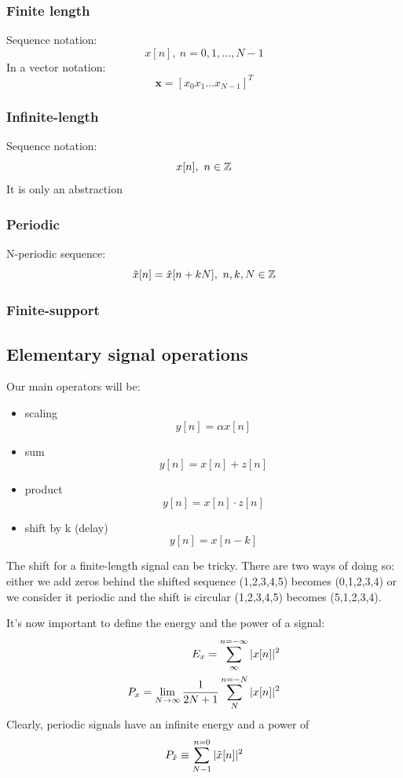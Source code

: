 \documentclass[11pt,a4paper]{article}
\numberwithin{equation}{section}
\begin{document}
\subsubsection{Finite length}
Sequence notation:
\begin{equation}
    x[n],\ n=0,1,\ldots,N-1
\end{equation}
In a vector notation: 
\begin{equation}
    \mathbf{x} = [x_0x_1\ldots x_{N-1}]^T
\end{equation}
\subsubsection{Infinite-length}
Sequence notation: 
\begin{equation}
    x[n],\ n\in \Z
\end{equation}
It is only an abstraction

\subsubsection{Periodic}
N-periodic sequence: 
\begin{equation}
    \tilde{x}[n] = \tilde{x}[n+kN],\ n,k,N \in \Z
\end{equation}
\subsubsection{Finite-support}
\subsection{Elementary signal operations}
Our main operators will be:
\begin{itemize}
    \item scaling
        \[y[n] = \alpha x[n]\]
    \item sum
        \[y[n] = x[n] + z[n]\]
    \item product
        \[y[n] = x[n] \cdot z[n]\]
    \item shift by k (delay)
        \[y[n] = x[n-k]\]
\end{itemize}
The shift for a finite-length signal can be tricky. There are two ways of doing so: either we add zeros behind the shifted sequence (1,2,3,4,5) becomes (0,1,2,3,4) or we consider it periodic and the shift is circular (1,2,3,4,5) becomes (5,1,2,3,4).

It's now important to define the energy and the power of a signal: 
\begin{align}
    E_x = \somme{n=-\infty}{\infty}|x[n]|^2\\
    P_x = \limite{N\to\infty} \frac{1}{2N+1} \somme{n=-N}{N}|x[n]|^2
\end{align}
Clearly, periodic signals have an infinite energy and a power of 
\[P_{\tilde{x}} \equiv \somme{n=0}{N-1}|\tilde{x}[n]|^2\]
\end{document}
